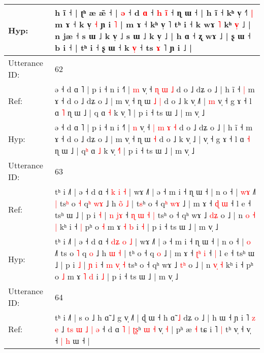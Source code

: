 \documentclass[10pt]{article}
\DeclareRobustCommand{\hl}[1]{{\textcolor{red}{#1}}}
\begin{document}
\begin{longtable}{ll}
 \\
Hyp: & h ĩ ˧ | ʈʰ æ æ̃ ˧ | \hl{}\hl{ə} ˧ d \hl{ɑ} ˧\hl{ }\hl{h} \hl{i}\hl{̃} ˧ ɳ ɯ ˧ | h ĩ ˧ kʰ v̩ ˧\hl{˥}\hl{ }\hl{|} m ɤ ˧ k v̩ \hl{˧} ɲ i \hl{˥} | m ɤ ˧ kʰ v̩ ˥\hl{}\hl{} tʰ i ˧ k wɤ \hl{˥} kʰ \hl{v}\hl{̩} ˩ | n jæ ˧ s ɯ ˩ k v̩ ˩\hl{}\hl{}\hl{}\hl{} s ɯ ˩ k v̩ ˩ | h ɑ ˧ ʐ wɤ ˩ | ʂ ɯ ˧ b i ˧ | tʰ i ˧ ʂ ɯ ˧ k\hl{ }\hl{v}\hl{̩} ˧ ts \hl{ɤ} ˥ ɲ i ˩ |
 \\
\midrule
Utterance ID: & 62 \\
Ref: & ə ˧ d ɑ ˥ | p i ˧ n i ˧˥ | \hl{m} v̩ ˧\hl{}\hl{} \hl{ɳ} \hl{ɯ} \hl{˩} d o ˩ dʑ o ˩ | h ĩ ˧\hl{ }\hl{|} m ɤ ˧ d o ˩ dʑ o ˩ | m v̩ ˧ ɳ ɯ\hl{ }\hl{˩} \hl{|} d o ˩ k v̩ ˩\hl{˥} |\hl{ }\hl{m} v̩ ˧ g ɤ ˧ l ɑ \hl{˥} ɳ ɯ ˩ | q\hl{} ɑ \hl{˧} k v̩ \hl{}˥ | p i ˧ ts ɯ ˩ | m v̩ ˩
 \\
Hyp: & ə ˧ d ɑ ˥ | p i ˧ n i ˧˥ | \hl{n} v̩ ˧\hl{ }\hl{|} \hl{m} \hl{ɤ} \hl{˧} d o ˩ dʑ o ˩ | h ĩ ˧\hl{}\hl{} m ɤ ˧ d o ˩ dʑ o ˩ | m v̩ ˧ ɳ ɯ\hl{}\hl{} \hl{˧} d o ˩ k v̩ ˩\hl{} |\hl{}\hl{} v̩ ˧ g ɤ ˧ l ɑ \hl{˧} ɳ ɯ ˩ | q\hl{ʰ} ɑ \hl{˩} k v̩ \hl{˧}˥ | p i ˧ ts ɯ ˩ | m v̩ ˩
 \\
\midrule
Utterance ID: & 63 \\
Ref: & tʰ i ˩˥ | ə ˧ d ɑ ˧ \hl{}\hl{k} \hl{i} \hl{˧} | wɤ ˩˥ | ə ˧ m i ˧ ɳ ɯ ˧ | n o ˧ | \hl{w}\hl{ɤ} ˩˥\hl{ }\hl{|} ts\hl{ʰ} o \hl{˧} q\hl{ʰ} \hl{w}\hl{ɤ} ˩ h \hl{o}\hl{̃} \hl{˩} | t\hl{s}ʰ o ˧ q\hl{ʰ} \hl{w}\hl{ɤ} ˩ | m ɤ ˧ \hl{}\hl{ɖ} \hl{ɯ} ˧\hl{}\hl{} l e ˧ tsʰ ɯ ˩ | p i \hl{˧} | \hl{n} \hl{j}\hl{ɤ} ˧ \hl{ɳ} \hl{ɯ}\hl{ }\hl{˧} \hl{|} tsʰ o ˧ qʰ wɤ ˩ \hl{d}\hl{ʑ} o ˩ | n \hl{o}\hl{ }\hl{˧} \hl{|} kʰ i ˧\hl{ }\hl{|} pʰ o \hl{˧} m ɤ \hl{˧} \hl{b} i \hl{˧} | p i ˧ ts ɯ ˩ | m v̩ ˩
 \\
Hyp: & tʰ i ˩˥ | ə ˧ d ɑ ˧ \hl{d}\hl{ʑ} \hl{o} \hl{˩} | wɤ ˩˥ | ə ˧ m i ˧ ɳ ɯ ˧ | n o ˧ | \hl{}\hl{o} ˩˥\hl{}\hl{} ts\hl{} o \hl{˥} q\hl{} \hl{}\hl{o} ˩ h \hl{}\hl{ɯ} \hl{˧} | t\hl{}ʰ o ˧ q\hl{} \hl{}\hl{o} ˩ | m ɤ ˧ \hl{ʈ}\hl{ʰ} \hl{i} ˧\hl{ }\hl{|} l e ˧ tsʰ ɯ ˩ | p i \hl{˩} | \hl{ɲ} \hl{}\hl{i} ˧ \hl{m} \hl{}\hl{v}\hl{̩} \hl{˧} tsʰ o ˧ qʰ wɤ ˩ \hl{t}\hl{ʰ} o ˩ | n \hl{}\hl{v}\hl{̩} \hl{˧} kʰ i ˧\hl{}\hl{} pʰ o \hl{˩} m ɤ \hl{˥} \hl{d} i \hl{˩} | p i ˧ ts ɯ ˩ | m v̩ ˩
 \\
\midrule
Utterance ID: & 64 \\
Ref: & tʰ i ˩˥ | s o ˩ h ɑ̃ ˩ g v̩ ˩˥ | ɖ ɯ ˧ h ɑ̃ \hl{}\hl{˩} dʑ o ˩ | h ɯ ˧ ɲ i ˥ \hl{}\hl{z} \hl{e} ˩ \hl{t}\hl{s} \hl{ɯ} \hl{}\hl{˩} \hl{|} \hl{ə} ˧ d ɑ\hl{ }\hl{˥} \hl{|} \hl{ʈ}\hl{ʂ}ʰ \hl{}\hl{ɯ} \hl{˧} v̩ \hl{˧} | pʰ æ \hl{˧} tɕ i ˥\hl{ }\hl{|} tʰ v̩ ˧ v̩ ˧\hl{ }\hl{|} \hl{h} ɯ ˧ |

\end{longtable}
\end{document}
